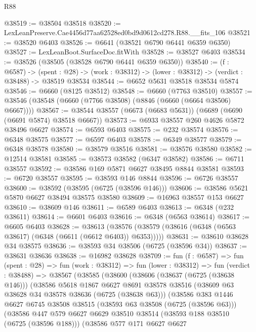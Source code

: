 \begin{lexlean}{R88}
\begin{coremodule}
@38519 := @38504 @38518
@38520 := LexLeanPreserve.Cae4456d77aa62528ed0bd9d0612cd278.R88.__fits_106
@38521 := @38520 @6403
@38526 := @6641 (@38521 @6790 @6441 @6359 @6350)
@38527 := LexLeanBoot.SurfaceDoc.fitWith
@38528 := @38527 @6403
@38534 := @38526 (@38505 (@38528 @6790 @6441 @6359 @6350))
@38540 := (f : @6587) ->
  (spent : @28) -> (work : @38312) -> (lower : @38312) -> (verdict : @38488) -> @38519 @38534
@38544 := @6652 @5631 @38518 @38534 @5874
@38546 := @6660 (@8125 @38512)
@38548 := @6660 (@7763 @38510)
@38557 := @38546 (@38548 (@6660 (@7766 @38508) (@8846 (@6660 (@6664 @38506) @6667))))
@38567 := @38544 @38557 (@6673 (@6683 @5631)) (@6689 (@6690 (@6691 @5874) @38518 @6667))
@38573 := @6933 @38557 @260 @4626 @5872 @38496 @6627
@38574 := @6593 @6403
@38575 := @232 @38574
@38576 := @6348 @38575
@38577 := @6597 @6403
@38578 := @6349 @38577
@38579 := @6348 @38578
@38580 := @38579 @38516
@38581 := @38576 @38580
@38582 := @12514 @38581
@38585 := @38573 @38582 (@6347 @38582)
@38586 := @6711 @38557
@38592 := @38586 @169 @5871 @6627 @38495 @8844 @38581
@38593 := @6720 @38557
@38595 := @38593 @146 @8844
@38596 := @6726 @38557
@38600 := @38592 (@38595 (@6725 (@38596 @146)))
@38606 := @38586 @5621 @5870 @6627 @38494 @38575 @38580
@38609 := @16963 @38557 @153 @6627
@38610 := @38609 @146
@38611 := @6589 @6403
@38613 := @6348 (@232 @38611)
@38614 := @6601 @6403
@38616 := @6348 (@6563 @38614)
@38617 := @6605 @6403
@38628 := @38613
    (@38576 (@38579 (@38616 (@6348 (@6563 @38617) (@6348 (@6611 (@6612 @6403)) @6353)))))
@38631 := @38610 @38628 @34 @38575
@38636 := @38593 @34 @38506 (@6725 (@38596 @34))
@38637 := @38631 @38636
@38638 := @16982 @38628
@38709 := fun (f : @6587) =>
  fun (spent : @28) =>
  fun (work : @38312) =>
  fun (lower : @38312) =>
  fun (verdict : @38488) =>
  @38567
    (@38585
      (@38600
        (@38606
          (@38637 (@6725 (@38638 @146)))
          (@38586
            @5618
            @1867
            @6627
            @8691
            @38578
            @38516
            (@38609 @63 @38628 @34 @38578 @38636 (@6725 (@38638 @63)))
            (@38586
              @383
              @1446
              @6627
              @6745
              @38508
              @38515
              (@38593 @63 @38508 (@6725 (@38596 @63)))
              (@38586
                @447
                @579
                @6627
                @6629
                @38510
                @38514
                (@38593 @188 @38510 (@6725 (@38596 @188)))
                (@38586
                  @577
                  @171
                  @6627
                  @6627

\end{coremodule}
\end{lexlean}

